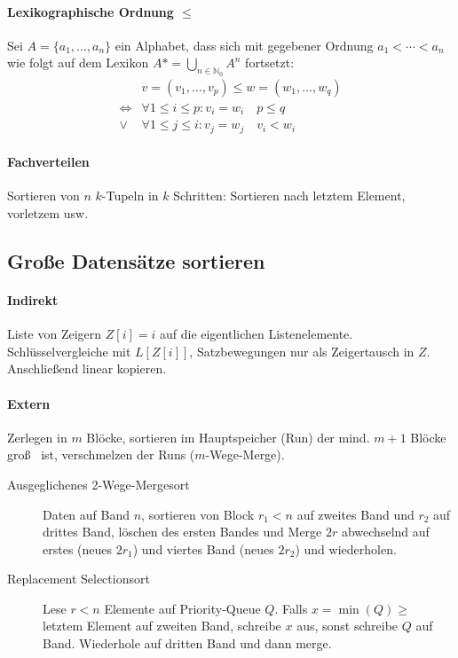 \begin{mzImportant}
  \paragraph{Lexikographische Ordnung $\mathbf{\leq}$}
  Sei $A = \{ a_1, \dots, a_n \}$ ein Alphabet, dass sich mit gegebener Ordnung $a_1 < \cdots < a_n$ wie folgt auf dem Lexikon $A* = \bigcup_{n \in \mathbb{N}_0} A^n$ fortsetzt:
  \begin{align*}
                    & v = (v_1, \dots, v_p) \leq w = (w_1, \dots, w_q)   \\
    \Leftrightarrow & \forall 1 \leq i \leq p: v_i = w_i \quad p \leq q  \\
    \lor            & \forall 1 \leq j \leq i: v_j = w_j \quad v_i < w_i
  \end{align*}

  \paragraph{Fachverteilen}
  Sortieren von $n$ $k$-Tupeln in $k$ Schritten: Sortieren nach letztem Element, vorletzem usw.
\end{mzImportant}

\subsection{Gro\ss e Datensätze sortieren}

\paragraph{Indirekt}
Liste von Zeigern $Z[i] = i$ auf die eigentlichen Listenelemente. Schlüsselvergleiche mit $L[Z[i]]$, Satzbewegungen nur als Zeigertausch in $Z$. Anschlie\ss end linear kopieren.

\paragraph{Extern}
Zerlegen in $m$ Blöcke, sortieren im Hauptspeicher (Run) der mind. $m + 1$ Blöcke gro\ss~ ist, verschmelzen der Runs ($m$-Wege-Merge).

\begin{description}
  \item [Ausgeglichenes 2-Wege-Mergesort]
        Daten auf Band $n$, sortieren von Block $r_1 < n$ auf zweites Band und $r_2$ auf drittes Band, löschen des ersten Bandes und Merge $2r$ abwechselnd auf erstes (neues $2r_1$) und viertes Band (neues $2r_2$) und wiederholen.

  \item [Replacement Selectionsort]
        Lese $r < n$ Elemente auf Priority-Queue $Q$. Falls $x = \min(Q) \geq$ letztem Element auf zweiten Band, schreibe $x$ aus, sonst schreibe $Q$ auf Band. Wiederhole auf dritten Band und dann merge.
\end{description}

